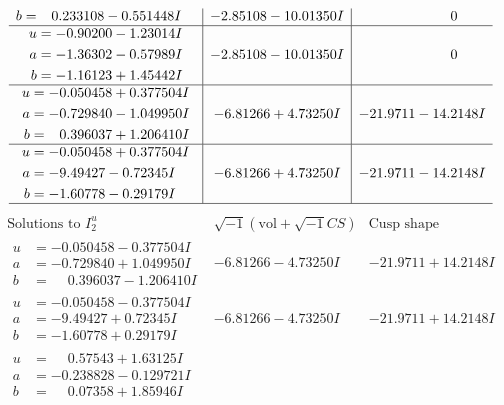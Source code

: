 \documentclass[1p]{elsarticle_modified}
\theoremstyle{definition}
\newcommand{\I}{\sqrt{-1}}
\begin{document}
$$\begin{array}{c|c|c}
\begin{aligned}
b &= \phantom{-}0.233108 - 0.551448 I\end{aligned}
 & -2.85108 - 10.01350 I & \phantom{-0.000000 } 0 \\ \hline\begin{aligned}
u &= -0.90200 - 1.23014 I \\
a &= -1.36302 - 0.57989 I \\
b &= -1.16123 + 1.45442 I\end{aligned}
 & -2.85108 - 10.01350 I & \phantom{-0.000000 } 0 \\ \hline\begin{aligned}
u &= -0.050458 + 0.377504 I \\
a &= -0.729840 - 1.049950 I \\
b &= \phantom{-}0.396037 + 1.206410 I\end{aligned}
 & -6.81266 + 4.73250 I & -21.9711 - 14.2148 I \\ \hline\begin{aligned}
u &= -0.050458 + 0.377504 I \\
a &= -9.49427 - 0.72345 I \\
b &= -1.60778 - 0.29179 I\end{aligned}
 & -6.81266 + 4.73250 I & -21.9711 - 14.2148 I\\
 \hline 
 \end{array}$$\newpage$$\begin{array}{c|c|c}  
\text{Solutions to }I^u_{2}& \I (\text{vol} + \sqrt{-1}CS) & \text{Cusp shape}\\
 \hline 
\begin{aligned}
u &= -0.050458 - 0.377504 I \\
a &= -0.729840 + 1.049950 I \\
b &= \phantom{-}0.396037 - 1.206410 I\end{aligned}
 & -6.81266 - 4.73250 I & -21.9711 + 14.2148 I \\ \hline\begin{aligned}
u &= -0.050458 - 0.377504 I \\
a &= -9.49427 + 0.72345 I \\
b &= -1.60778 + 0.29179 I\end{aligned}
 & -6.81266 - 4.73250 I & -21.9711 + 14.2148 I \\ \hline\begin{aligned}
u &= \phantom{-}0.57543 + 1.63125 I \\
a &= -0.238828 - 0.129721 I \\
b &= \phantom{-}0.07358 + 1.85946 I\end{aligned}

\end{array}$$
\end{document}
